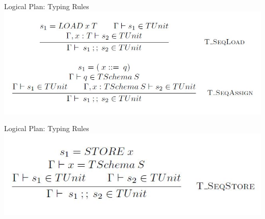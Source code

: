 \begin{frame}{Logical Plan: Typing Rules}
\centering
%
\includegraphics[scale=0.4]{Images/TypingRules/SEQ1.JPG}
\end{frame}

\begin{frame}{Logical Plan: Typing Rules}
\centering
\includegraphics[scale=0.4]{Images/TypingRules/SEQ2.JPG}
\end{frame}


